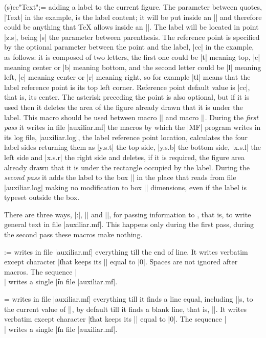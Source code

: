\macro\MTlabel*(s)cc"Text";= adding a label to the current figure.
The parameter between quotes, |Text| in the example, is the label
content; it will be put inside an |\hbox| and therefore could be
anything that {\TeX} allows inside an |\hbox|.  The label will be
located in {\MF} point |z.s|, being |s| the parameter between
parenthesis.  The reference point is specified by the optional
parameter between the point and the label, |cc| in the example, as
follows:  it is composed of two letters, the first one could be |t|
meaning top, |c| meaning center or |b| meaning bottom, and the
second letter could be |l| meaning left, |c| meaning center or |r|
meaning right, so for example |tl| means that the label reference
point is its top left corner.  Reference point default value is
|cc|, that is, its center.  The asterisk preceding the point is
also optional, but if it is used then
it deletes the area of the figure already drawn that it is under
the label.  This macro should be used between macro |\MTbeginchar|
and macro |\MTendchar|.  During the {\it first pass\/} it writes in
file |auxiliar.mf| the {\MF} macros by which the |MF| program writes
in its log file, |auxiliar.log|, the label reference point location,
calculates the four label sides returning them as |y.s.t| the top
side, |y.s.b| the bottom side, |x.s.l| the left side and |x.s.r| the
right side and deletes, if it is required, the figure area already
drawn that it is under the rectangle occupied by the label.  During
the {\it second pass\/} it adds the label to the box |\MTbox| in the
place that reads from file |auxiliar.log| making no modification to
box |\MTbox| dimensions, even if the label is typeset outside the
box.

There are three ways, |\MT:|, |\MTcode| and |\MTline|, for passing
information to \MF, that is, to write general text in
file |auxiliar.mf|.  This happens only during the first pass, during
the second pass these macros make nothing.

\macro\MT:= writes in file |auxiliar.mf| everything till the end of
line.  It writes verbatim except character |\| that keeps its
|\catcode| equal to |0|.  Spaces are not ignored after macros.  The
sequence |\\| writes a single |\| in file |auxiliar.mf|.

\macro\MTcode= writes in file |auxiliar.mf| everything till it finds
a line equal, including |\catcode|s, to the current value of
|\MTendmark|, by default till it finds a blank line, that is,
|\def\MTendmark{}|.  It writes verbatim except character |\| that
keeps its |\catcode| equal to |0|.  The sequence |\\| writes a
single |\| in file |auxiliar.mf|.

